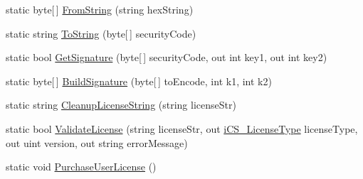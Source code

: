 \begin{DoxyCompactItemize}
static byte\mbox{[}$\,$\mbox{]} \hyperlink{classi_c_s___license_controller_a507c2b5b07b7a105e9b05e9b3bd02f22}{From\+String} (string hex\+String)
\item 
static string \hyperlink{classi_c_s___license_controller_af0bb61e9b6ec35d05a7873d47390f14e}{To\+String} (byte\mbox{[}$\,$\mbox{]} security\+Code)
\item 
static bool \hyperlink{classi_c_s___license_controller_a9e63f115265057e4dfeaef39a4103807}{Get\+Signature} (byte\mbox{[}$\,$\mbox{]} security\+Code, out int key1, out int key2)
\item 
static byte\mbox{[}$\,$\mbox{]} \hyperlink{classi_c_s___license_controller_a9eda56642427789c807bd19a4d4efc85}{Build\+Signature} (byte\mbox{[}$\,$\mbox{]} to\+Encode, int k1, int k2)
\item 
static string \hyperlink{classi_c_s___license_controller_ace61893d91cb7abbb91c40f545fb4a1b}{Cleanup\+License\+String} (string license\+Str)
\item 
static bool \hyperlink{classi_c_s___license_controller_a84fde0effc0b27decd4eb34e9cd9de97}{Validate\+License} (string license\+Str, out \hyperlink{i_c_s___license_controller_8cs_aa581c1c774c6ec13289aa77f51043156}{i\+C\+S\+\_\+\+License\+Type} license\+Type, out uint version, out string error\+Message)
\item 
static void \hyperlink{classi_c_s___license_controller_a79e01000cd1ed4868664bc6c54c2f63c}{Purchase\+User\+License} ()
\end{DoxyCompactItemize}
